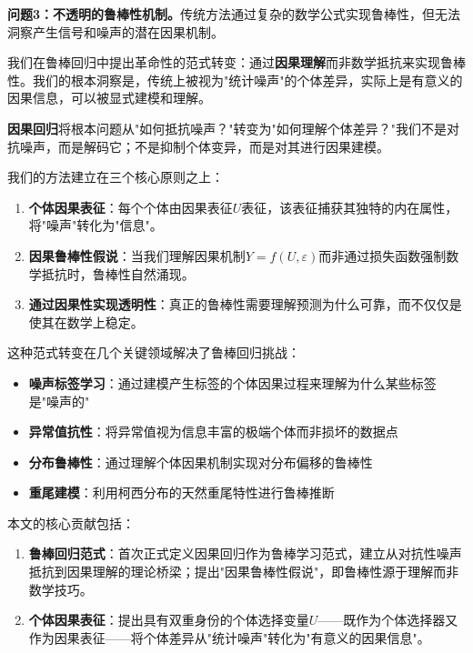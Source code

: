 \documentclass[conference]{IEEEtran}
\begin{document}
\begin{CJK}{UTF8}{gbsn}
\textbf{问题3：不透明的鲁棒性机制。}传统方法通过复杂的数学公式实现鲁棒性，但无法洞察产生信号和噪声的潜在因果机制。

我们在鲁棒回归中提出革命性的范式转变：通过\textbf{因果理解}而非数学抵抗来实现鲁棒性。我们的根本洞察是，传统上被视为"统计噪声"的个体差异，实际上是有意义的因果信息，可以被显式建模和理解。

\textbf{因果回归}将根本问题从"如何抵抗噪声？"转变为"如何理解个体差异？"我们不是对抗噪声，而是解码它；不是抑制个体变异，而是对其进行因果建模。

我们的方法建立在三个核心原则之上：

\begin{enumerate}
\item \textbf{个体因果表征}：每个个体由因果表征$U$表征，该表征捕获其独特的内在属性，将"噪声"转化为"信息"。

\item \textbf{因果鲁棒性假说}：当我们理解因果机制$Y = f(U, \varepsilon)$而非通过损失函数强制数学抵抗时，鲁棒性自然涌现。

\item \textbf{通过因果性实现透明性}：真正的鲁棒性需要理解预测为什么可靠，而不仅仅是使其在数学上稳定。
\end{enumerate}

这种范式转变在几个关键领域解决了鲁棒回归挑战：

\begin{itemize}
\item \textbf{噪声标签学习}：通过建模产生标签的个体因果过程来理解为什么某些标签是"噪声的"
\item \textbf{异常值抗性}：将异常值视为信息丰富的极端个体而非损坏的数据点
\item \textbf{分布鲁棒性}：通过理解个体因果机制实现对分布偏移的鲁棒性
\item \textbf{重尾建模}：利用柯西分布的天然重尾特性进行鲁棒推断
\end{itemize}

本文的核心贡献包括：

\begin{enumerate}
\item \textbf{鲁棒回归范式}：首次正式定义因果回归作为鲁棒学习范式，建立从对抗性噪声抵抗到因果理解的理论桥梁；提出"因果鲁棒性假说"，即鲁棒性源于理解而非数学技巧。

\item \textbf{个体因果表征}：提出具有双重身份的个体选择变量$U$——既作为个体选择器又作为因果表征——将个体差异从"统计噪声"转化为"有意义的因果信息"。


\end{enumerate}
\end{CJK}
\end{document}
